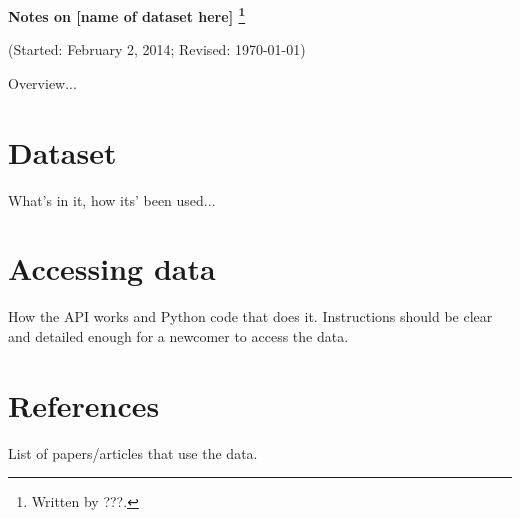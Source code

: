 \documentclass[11pt]{article}
\begin{document}
\bigskipamount
\parindent=0.0in
\thispagestyle{empty}

\bigskip
\centerline{\Large \bf Notes on [name of dataset here]%
\footnote{Written by ???.}}
\centerline{(Started: February 2, 2014; Revised: \today)}

\bigskip
Overview...


\section{Dataset}

What's in it, how its' been used...



\section{Accessing data}

How the API works and Python code that does it.
Instructions should be clear and detailed enough for a newcomer to access the data.


\section{References}


List of papers/articles that use the data.
\end{document}
